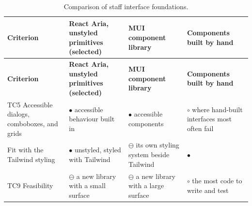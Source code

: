 {\small{}\renewcommand{\arraystretch}{1.1}
\begin{longtable}{|>{\raggedright\arraybackslash}p{}|>{\raggedright\arraybackslash}p{}|>{\raggedright\arraybackslash}p{}|>{\raggedright\arraybackslash}p{}|}
\caption{Comparison of staff interface foundations.} \\
\hline
\textbf{Criterion} & \textbf{React Aria, unstyled primitives (selected)\cite{r146}} & \textbf{MUI component library\cite{r177}} & \textbf{Components built by hand} \\ \hline
\endfirsthead
\hline
\textbf{Criterion} & \textbf{React Aria, unstyled primitives (selected)\cite{r146}} & \textbf{MUI component library\cite{r177}} & \textbf{Components built by hand} \\ \hline
\endhead
TC5 Accessible dialogs, comboboxes, and grids & $\bullet$ accessible behaviour built in & $\bullet$ accessible components & $\circ$ where hand-built interfaces most often fail \\ \hline
Fit with the Tailwind styling & $\bullet$ unstyled, styled with Tailwind & $\ominus$ its own styling system beside Tailwind & $\bullet$ \\ \hline
TC9 Feasibility & $\ominus$ a new library with a small surface & $\ominus$ a new library with a large surface & $\circ$ the most code to write and test \\ \hline
\end{longtable}
}

